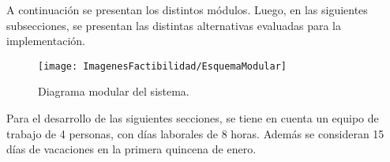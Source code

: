 %
%
%



A continuación se presentan los distintos módulos. Luego, en las siguientes subsecciones, se presentan las distintas alternativas evaluadas para la implementación.
\begin{figure}[H]
	\centering
	\texttt{[image: ImagenesFactibilidad/EsquemaModular]}
	\label{fig:esquema_modular}
	\caption{Diagrama modular del sistema.}
\end{figure}





%















Para el desarrollo de las siguientes secciones, se tiene en cuenta un equipo de trabajo de 4 personas, con días laborales de 8 horas. Además se consideran 15 días de vacaciones en la primera quincena de enero.







\label{sec:legal}


%